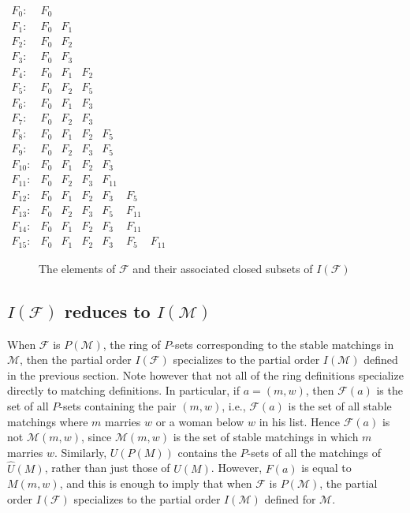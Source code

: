 \begin{center}
    $\begin{array}{lllllll}F_0: & F_0 & & & & & \\ F_1: & F_0 & F_1 & & & & \\ F_2: & F_0 & F_2 & & & & \\ F_3: & F_0 & F_3 & & & & \\ F_4: & F_0 & F_1 & F_2 & & & \\ F_5: & F_0 & F_2 & F_5 & & & \\ F_6: & F_0 & F_1 & F_3 & & & \\ F_7: & F_0 & F_2 & F_3 & & & \\ F_8: & F_0 & F_1 & F_2 & F_5 & & \\ F_9: & F_0 & F_2 & F_3 & F_5 & & \\ F_{10}: & F_0 & F_1 & F_2 & F_3 & & \\ F_{11}: & F_0 & F_2 & F_3 & F_{11} & & \\ F_{12}: & F_0 & F_1 & F_2 & F_3 & F_5 & \\ F_{13}: & F_0 & F_2 & F_3 & F_5 & F_{11} & \\ F_{14}: & F_0 & F_1 & F_2 & F_3 & F_{11} & \\ F_{15}: & F_0 & F_1 & F_2 & F_3 & F_5 & F_{11} \end{array}$
    \begin{figure}[ht]
  \centering
  \caption{The elements of $\mathcal{F}$ and their associated closed subsets of $I(\mathcal{F})$}
  \label{FIG_2_7}
\end{figure}
\end{center}

\subsection{$I(\mathcal{F})$ reduces to $I(\mathcal{M})$}
When $\mathcal{F}$ is $P(\mathcal{M})$, the ring of $P$-sets corresponding to the stable matchings in $\mathcal{M}$, then the partial order $I(\mathcal{F})$ specializes to the partial order $I(\mathcal{M})$ defined in the previous section. Note however that not all of the ring definitions specialize directly to matching definitions. In particular, if $a=(m, w)$, then $\mathcal{F}(a)$ is the set of all $P$-sets containing the pair $(m, w)$, i.e., $\mathcal{F}(a)$ is the set of all stable matchings where $m$ marries $w$ or a woman below $w$ in his list. Hence $\mathcal{F}(a)$ is not $\mathcal{M}(m, w)$, since $\mathcal{M}(m, w)$ is the set of stable matchings in which $m$ marries $w$. Similarly, $U(P(M))$ contains the $P$-sets of all the matchings of $\hat{U}(M)$, rather than just those of $U(M)$. However, $F(a)$ is equal to $M(m, w)$, and this is enough to imply that when $\mathcal{F}$ is $P(\mathcal{M})$, the partial order $I(\mathcal{F})$ specializes to the partial order $I(\mathcal{M})$ defined for $\mathcal{M}$.
